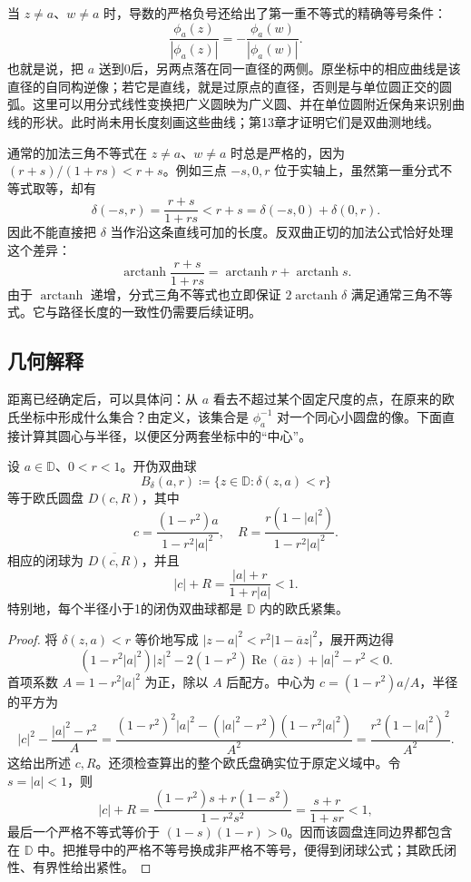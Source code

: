 当 \(z\ne a\)、\(w\ne a\) 时，导数的严格负号还给出了第一重不等式的精确等号条件：
\[
 \frac{\phi_a(z)}{|\phi_a(z)|}
 =-\frac{\phi_a(w)}{|\phi_a(w)|}.
\]
也就是说，把 \(a\) 送到0后，另两点落在同一直径的两侧。原坐标中的相应曲线是该直径的自同构逆像；若它是直线，就是过原点的直径，否则是与单位圆正交的圆弧。这里可以用分式线性变换把广义圆映为广义圆、并在单位圆附近保角来识别曲线的形状。此时尚未用长度刻画这些曲线；第13章才证明它们是双曲测地线。

\ProseParagraphBreak
通常的加法三角不等式在 \(z\ne a\)、\(w\ne a\) 时总是严格的，因为 \((r+s)/(1+rs)<r+s\)。例如三点 \(-s,0,r\) 位于实轴上，虽然第一重分式不等式取等，却有
\[
 \delta(-s,r)=\frac{r+s}{1+rs}<r+s
 =\delta(-s,0)+\delta(0,r).
\]
因此不能直接把 \(\delta\) 当作沿这条直线可加的长度。反双曲正切的加法公式恰好处理这个差异：
\[
 \operatorname{arctanh}\frac{r+s}{1+rs}
 =\operatorname{arctanh}r+\operatorname{arctanh}s.
\]
由于 \(\operatorname{arctanh}\) 递增，分式三角不等式也立即保证 \(2\operatorname{arctanh}\delta\) 满足通常三角不等式。它与路径长度的一致性仍需要后续证明。

\subsection{几何解释}
\label{b3:subsec:060203}

距离已经确定后，可以具体问：从 \(a\) 看去不超过某个固定尺度的点，在原来的欧氏坐标中形成什么集合？由定义，该集合是 \(\phi_a^{-1}\) 对一个同心小圆盘的像。下面直接计算其圆心与半径，以便区分两套坐标中的“中心”。

\begin{proposition}\label{b3:prop:06-pseudohyperbolic-ball}
设 \(a\in\mathbb D\)、\(0<r<1\)。开伪双曲球
\[
 B_\delta(a,r)\coloneqq\{z\in\mathbb D:\delta(z,a)<r\}
\]
等于欧氏圆盘 \(D(c,R)\)，其中
\[
 c=\frac{(1-r^2)a}{1-r^2|a|^2},\quad
 R=\frac{r(1-|a|^2)}{1-r^2|a|^2}.
\]
相应的闭球为 \(\overline{D(c,R)}\)，并且
\[
 |c|+R=\frac{|a|+r}{1+r|a|}<1.
\]
特别地，每个半径小于1的闭伪双曲球都是 \(\mathbb D\) 内的欧氏紧集。
\end{proposition}
\begin{proof}
将 \(\delta(z,a)<r\) 等价地写成
\(|z-a|^2<r^2|1-\overline a z|^2\)，展开两边得
\[
 (1-r^2|a|^2)|z|^2
 -2(1-r^2)\operatorname{Re}(\overline a z)+|a|^2-r^2<0.
\]
首项系数 \(A=1-r^2|a|^2\) 为正，除以 \(A\) 后配方。中心为 \(c=(1-r^2)a/A\)，半径的平方为
\[
 |c|^2-\frac{|a|^2-r^2}{A}
 =\frac{(1-r^2)^2|a|^2-(|a|^2-r^2)(1-r^2|a|^2)}{A^2}
 =\frac{r^2(1-|a|^2)^2}{A^2}.
\]
这给出所述 \(c,R\)。还须检查算出的整个欧氏盘确实位于原定义域中。令 \(s=|a|<1\)，则
\[
 |c|+R
 =\frac{(1-r^2)s+r(1-s^2)}{1-r^2s^2}
 =\frac{s+r}{1+sr}<1,
\]
最后一个严格不等式等价于 \((1-s)(1-r)>0\)。因而该圆盘连同边界都包含在 \(\mathbb D\) 中。把推导中的严格不等号换成非严格不等号，便得到闭球公式；其欧氏闭性、有界性给出紧性。
\end{proof}

